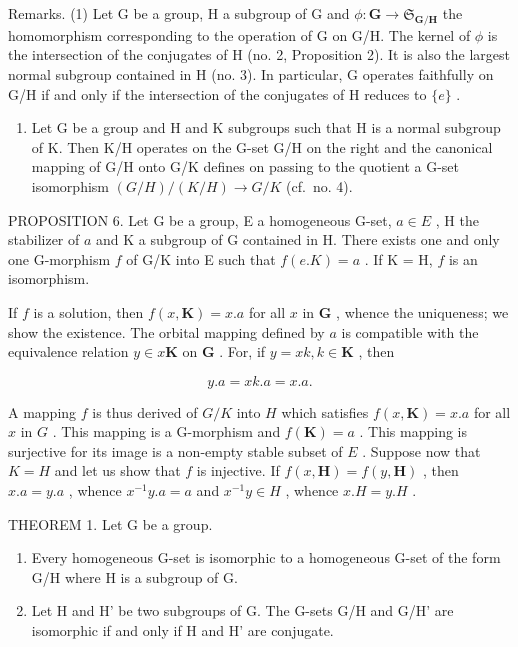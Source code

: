 Remarks. (1) Let G be a group, H a subgroup of G and \(\phi: \mathbf{G} \to \mathfrak{S}_{\mathbf{G}/\mathbf{H}}\) the homomorphism corresponding to the operation of G on G/H. The kernel of \(\phi\) is the intersection of the conjugates of H (no. 2, Proposition 2). It is also the largest normal subgroup contained in H (no. 3). In particular, G operates faithfully on G/H if and only if the intersection of the conjugates of H reduces to \(\{e\}\) .

\begin{enumerate}
\def\labelenumi{(\arabic{enumi})}
\setcounter{enumi}{1}
\tightlist
\item
  Let G be a group and H and K subgroups such that H is a normal subgroup of K. Then K/H operates on the G-set G/H on the right and the canonical mapping of G/H onto G/K defines on passing to the quotient a G-set isomorphism \((G/H)/(K/H) \rightarrow G/K\) (cf.~no. 4).
\end{enumerate}

PROPOSITION 6. Let G be a group, E a homogeneous G-set, \(a \in E\) , H the stabilizer of \(a\) and K a subgroup of G contained in H. There exists one and only one G-morphism \(f\) of G/K into E such that \(f(e.K) = a\) . If K = H, \(f\) is an isomorphism.

If \(f\) is a solution, then \(f(x, \mathbf{K}) = x.a\) for all \(x\) in \(\mathbf{G}\) , whence the uniqueness; we show the existence. The orbital mapping defined by \(a\) is compatible with the equivalence relation \(y \in x\mathbf{K}\) on \(\mathbf{G}\) . For, if \(y = xk, k \in \mathbf{K}\) , then

\[
y. a = x k. a = x. a.
\]

A mapping \(f\) is thus derived of \(G / K\) into \(H\) which satisfies \(f(x, \mathbf{K}) = x.a\) for all \(x\) in \(G\) . This mapping is a G-morphism and \(f(\mathbf{K}) = a\) . This mapping is surjective for its image is a non-empty stable subset of \(E\) . Suppose now that \(K = H\) and let us show that \(f\) is injective. If \(f(x, \mathbf{H}) = f(y, \mathbf{H})\) , then \(x.a = y.a\) , whence \(x^{-1}y.a = a\) and \(x^{-1}y \in H\) , whence \(x.H = y.H\) .

THEOREM 1. Let G be a group.

\begin{enumerate}
\def\labelenumi{(\alph{enumi})}
\item
  Every homogeneous G-set is isomorphic to a homogeneous G-set of the form G/H where H is a subgroup of G.
\item
  Let H and H' be two subgroups of G. The G-sets G/H and G/H' are isomorphic if and only if H and H' are conjugate.
\end{enumerate}

